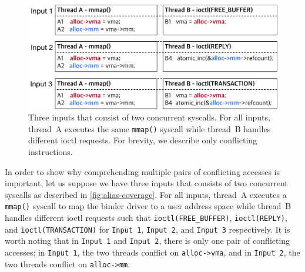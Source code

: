 \begin{figure}[t]
  \centering
  \includegraphics[width=0.98\linewidth]{fig/alias-coverage.pdf}
  \caption{Three inputs that consist of two concurrent syscalls. For
    all inputs, thread~A executes the same \texttt{mmap()} syscall
    while thread~B handles different ioctl requests. For brevity, we
    describe only conflicting instructions.}
  \label{fig:alias-coverage}
\end{figure}

%
In order to show why comprehending multiple pairs of conflicting
accesses is important, let us suppose we have three inputs that
consists of two concurrent syscalls as described in
\autoref{fig:alias-coverage}.
%
For all inputs, thread~A executes a \texttt{mmap()} syscall to map the
binder driver to a user address space while thread~B handles different
ioctl requests such that \texttt{ioctl(FREE_BUFFER)},
\texttt{ioctl(REPLY)}, and \texttt{ioctl(TRANSACTION)} for
\texttt{Input 1}, \texttt{Input 2}, and \texttt{Input 3} respectively.
%
It is worth noting that in \texttt{Input 1} and \texttt{Input 2},
there is only one pair of conflicting accesses; in \texttt{Input 1},
the two threads conflict on \texttt{alloc->vma}, and in \texttt{Input
  2}, the two threads conflict on \texttt{alloc->mm}.



